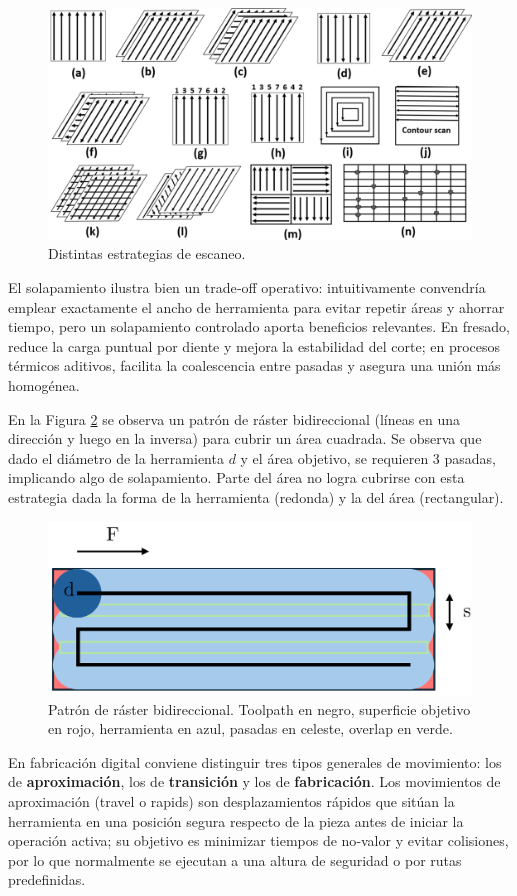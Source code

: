 \begin{figure}[h!]
	\centering
	\includegraphics[width=0.8\linewidth]{imgs/scans.png}
	\caption{Distintas estrategias de escaneo. \cite{escaninb}}
	\label{scansfig}
\end{figure}

El solapamiento ilustra bien un trade‑off operativo: intuitivamente convendría emplear exactamente el ancho de herramienta para evitar repetir áreas y ahorrar tiempo, pero un solapamiento controlado aporta beneficios relevantes. En fresado, reduce la carga puntual por diente y mejora la estabilidad del corte; en procesos térmicos aditivos, facilita la coalescencia entre pasadas y asegura una unión más homogénea.

En la Figura \ref{hashfig} se observa un patrón de ráster bidireccional (líneas en una dirección y luego en la inversa) para cubrir un área cuadrada. Se observa que dado el diámetro de la herramienta $d$ y el área objetivo, se requieren 3 pasadas, implicando algo de solapamiento. Parte del área no logra cubrirse con esta estrategia dada la forma de la herramienta (redonda) y la del área (rectangular).

\begin{figure}[h!]
	\centering
	\includegraphics[width=0.6\linewidth]{imgs/hash.png}
	\caption{Patrón de ráster bidireccional. Toolpath en negro, superficie objetivo en rojo, herramienta en azul, pasadas en celeste, overlap en verde.}
	\label{hashfig}
\end{figure}

En fabricación digital conviene distinguir tres tipos generales de movimiento: los de \textbf{aproximación}, los de \textbf{transición} y los de \textbf{fabricación}. Los movimientos de aproximación (travel o rapids) son desplazamientos rápidos que sitúan la herramienta en una posición segura respecto de la pieza antes de iniciar la operación activa; su objetivo es minimizar tiempos de no‑valor y evitar colisiones, por lo que normalmente se ejecutan a una altura de seguridad o por rutas predefinidas. 

